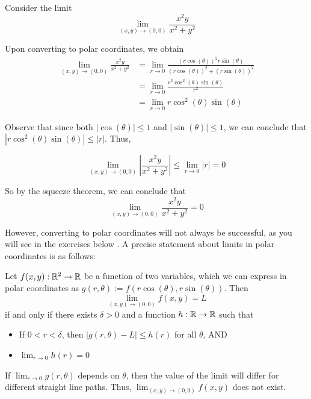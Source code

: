 \begin{example}
    Consider the limit $$\lim_{(x,y) \to (0,0)} \frac{x^2y}{x^2+y^2}$$  
    
    Upon converting to polar coordinates, we obtain 
    \begin{align*}
        \lim_{(x,y) \to (0,0)} \frac{x^2y}{x^2+y^2} &= \lim_{r \to 0} \frac{(r\cos(\theta))^2r\sin(\theta)}{(r\cos(\theta))^2 + (r\sin(\theta))^2} \\
        &= \lim_{r \to 0} \frac{r^3\cos^2(\theta)\sin(\theta)}{r^2} \\
        &= \lim_{r \to 0}r\cos^2(\theta)\sin(\theta) 
    \end{align*}

    Observe that since both $|\cos(\theta)| \leq 1$ and $|\sin(\theta)| \leq 1$, we can conclude that $|r\cos^2(\theta)\sin(\theta)| \leq |r|$.  Thus,
    
    $$\lim_{(x,y) \to (0,0)} \left|\frac{x^2y}{x^2+y^2}\right| \leq \lim_{r \to 0} |r| = 0$$
    
    So by the squeeze theorem, we can conclude that $$\lim_{(x,y) \to (0,0)} \frac{x^2y}{x^2+y^2} = 0$$  
\end{example}

However, converting to polar coordinates will not always be successful, as you will see in the exercises below .  A precise statement about limits in polar coordinates is as follows:

    
    \begin{theorem}\label{thm:polarlim}
    Let $f(x,y) : \mathbb{R}^2 \to \mathbb{R}$ be a function of two variables, which we can express in polar coordinates as $g(r,\theta) := f(r\cos(\theta), r\sin(\theta))$.  Then $$\lim_{(x,y) \to (0,0)} f(x,y) = L$$ if and only if there exists $\delta > 0$ and a function $h : \mathbb{R} \to \mathbb{R}$ such that 
    
    \begin{itemize}
        \item If $0 < r < \delta$, then $|g(r,\theta) - L| \leq h(r)$ for all $\theta$, AND
        \item $\lim_{r\to0} h(r) = 0$
    \end{itemize}

    \end{theorem}

\begin{corollary}
    If $\lim_{r \to 0} g(r,\theta)$ depends on $\theta$, then the value of the limit will differ for different straight line paths.  Thus, $\lim_{(x,y) \to (0,0)} f(x,y)$ does not exist.
\end{corollary}
    
